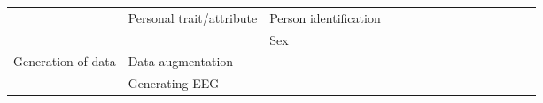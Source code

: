 \begin{tabular}{p{1.5cm}p{1.5cm}p{1.5cm}p{1.5cm}p{0.6cm}p{0.6cm}p{0.6cm}p{0.6cm}p{0.6cm}p{0.6cm}p{0.6cm}p{0.6cm}p{0.6cm}p{0.6cm}p{0.6cm}}
                                & Personal trait/attribute & Person identification &   &                                                             &                                                                                                                             &                                                                        &                                      &                                                            &                      &                         &                               &                     &                         &                                        \cite{Zhang2017e, Zhang2017c} \\
                                &                 & Sex &   &                                                             &                                                                                                       \cite{VanPutten2018b} &                                                                        &                                      &                                                            &                      &                         &                               &                     &                         &                                                                      \\
Generation of data & Data augmentation &   &   &                                                             &                                                                                 \cite{Wang2018, Zhang2018b, Schwabedal2018} &                                                                        &                                      &                                                            &                      &                         &                               &                     &                         &                                                                      \\
                                & Generating EEG &   &   &                                                             &                                                                                                                             &                                                                        &                                      &                                                            &  \cite{Hartmann2018} &                         &                               &                     &                         &                                                                      \\

\end{tabular}

